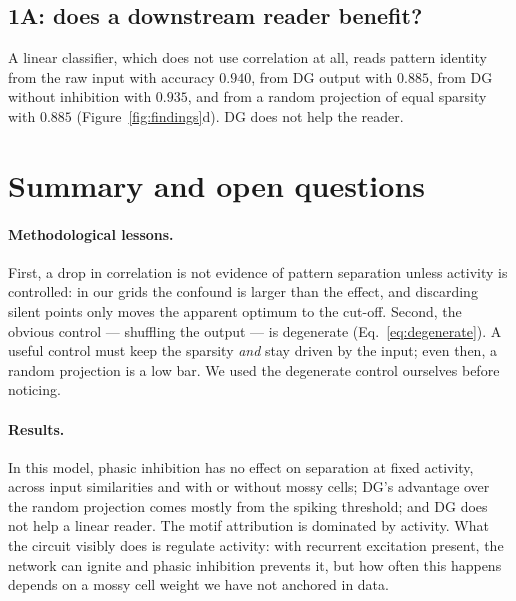 \documentclass[11pt,a4paper]{article}
\begin{document}
\subsection{1A: does a downstream reader benefit?}

A linear classifier, which does not use correlation at all, reads pattern
identity from the raw input with accuracy $0.940$, from DG output with $0.885$,
from DG without inhibition with $0.935$, and from a random projection of equal
sparsity with $0.885$ (Figure~\ref{fig:findings}d). DG does not help the reader.

\section{Summary and open questions}
\label{sec:outlook}

\paragraph{Methodological lessons.} First, a drop in correlation is not evidence
of pattern separation unless activity is controlled: in our grids the confound is
larger than the effect, and discarding silent points only moves the apparent
optimum to the cut-off. Second, the obvious control --- shuffling the output ---
is degenerate (Eq.~\eqref{eq:degenerate}). A useful control must keep the
sparsity \emph{and} stay driven by the input; even then, a random projection is a
low bar. We used the degenerate control ourselves before noticing.

\paragraph{Results.} In this model, phasic inhibition has no effect on separation
at fixed activity, across input similarities and with or without mossy cells;
DG's advantage over the random projection comes mostly from the spiking threshold;
and DG does not help a linear reader. The motif attribution is dominated by
activity. What the circuit visibly does is regulate activity: with recurrent
excitation present, the network can ignite and phasic inhibition prevents it, but
how often this happens depends on a mossy cell weight we have not anchored in data.
\end{document}
